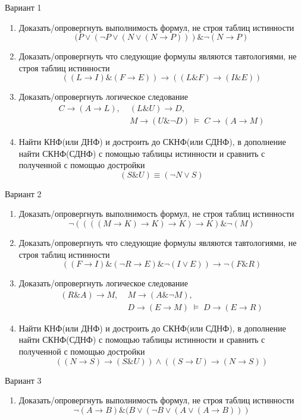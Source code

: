 \documentclass[10pt,a4paper]{article}
\begin{document}
 
\begin{multicols}{2}
\noindent
Вариант 1
\begin{enumerate}
\item Доказать/опровергнуть выполнимость формул, не строя таблиц истинности
$$(P\vee(\neg P\vee(N\vee(N\to P)))\&\neg(N\to P)$$
\item Доказать/опровергнуть что следующие формулы являются тавтологиями, не строя таблиц истинности
$$((L\to I)\&(F\to E))\to((L\& F)\to(I\&E))$$
\item Доказать/опровергнуть логическое следование
\begin{equation*}\begin{split}C\to(A\to L),\;& (L\& U)\to D,\; \\& M\to(U\&\neg D)\;\models\; C\to (A\to M)\end{split}\end{equation*}
\item Найти КНФ(или ДНФ) и достроить до СКНФ(или СДНФ), в дополнение найти СКНФ(СДНФ) с помощью таблицы истинности и сравнить с полученной с помощью достройки
$$(S\& U)\equiv(\neg N \vee S)$$
\end{enumerate}
Вариант 2
\begin{enumerate}
\item Доказать/опровергнуть выполнимость формул, не строя таблиц истинности
$$\neg((((M\to K)\to K)\to K)\to K)\&\neg(M)$$
\item Доказать/опровергнуть что следующие формулы являются тавтологиями, не строя таблиц истинности
$$((F\to I)\&(\neg R\to E)\&\neg(I\vee E))\to\neg(F\& R)$$
\item Доказать/опровергнуть логическое следование
\begin{equation*}\begin{split}(R\& A)\to M,\;& M\to(A\&\neg M),\; \\& D\to (E\to M)\;\models\; D\to(E\to R)\end{split}\end{equation*}
\item Найти КНФ(или ДНФ) и достроить до СКНФ(или СДНФ), в дополнение найти СКНФ(СДНФ) с помощью таблицы истинности и сравнить с полученной с помощью достройки
$$((N\to S)\to(S\& U))\wedge((S\to U)\to(N\to S))$$
\end{enumerate}
Вариант 3
\begin{enumerate}
\item Доказать/опровергнуть выполнимость формул, не строя таблиц истинности
$$\neg(A\to B)\&(B\vee(\neg B\vee(A\vee(A\to B)))$$

\end{enumerate}
\end{multicols}
\end{document}
